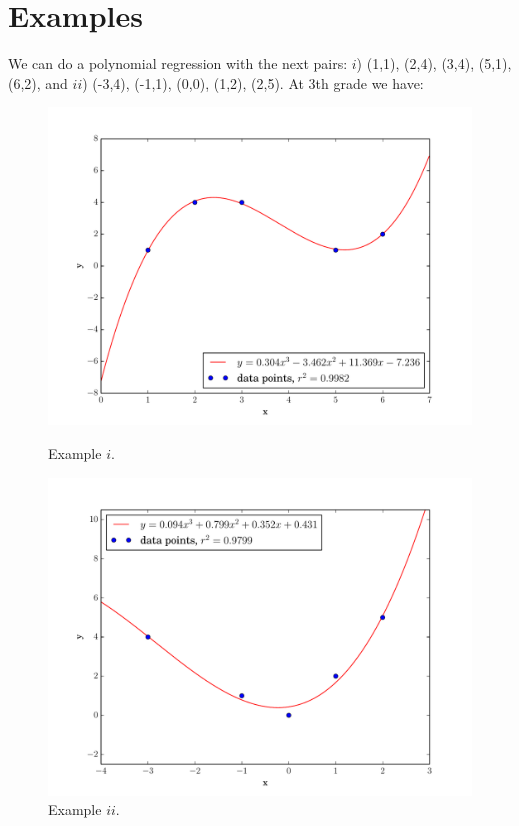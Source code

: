 \section{\textbf{Examples}}

We can do a polynomial regression with the next pairs:
$i$) (1,1), (2,4), (3,4), (5,1), (6,2), and
$ii$) (-3,4), (-1,1), (0,0), (1,2), (2,5). At 3th grade we have:

\begin{figure}[h]
    \begin{minipage}[t]{0.5\textwidth}
      \centering
      \includegraphics[width=\textwidth]{./img/6}
      \caption{Example $i$.}
    \end{minipage}%
    \hfill
    \begin{minipage}[t]{0.5\textwidth}
      \centering
      \includegraphics[width=\textwidth]{./img/7}
      \caption{Example $ii$.}
    \end{minipage}%
\end{figure}

